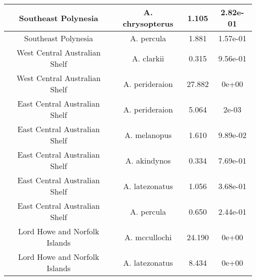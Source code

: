 \begin{table}[!h]
\begin{tabular}[t]{c|c|c|c}
\hline
Southeast Polynesia & A. chrysopterus & 1.105 & 2.82e-01\\
\hline
Southeast Polynesia & A. percula & 1.881 & 1.57e-01\\
\hline
West Central Australian Shelf & A. clarkii & 0.315 & 9.56e-01\\
\hline
West Central Australian Shelf & A. perideraion & 27.882 & 0e+00\\
\hline
East Central Australian Shelf & A. perideraion & 5.064 & 2e-03\\
\hline
East Central Australian Shelf & A. melanopus & 1.610 & 9.89e-02\\
\hline
East Central Australian Shelf & A. akindynos & 0.334 & 7.69e-01\\
\hline
East Central Australian Shelf & A. latezonatus & 1.056 & 3.68e-01\\
\hline
East Central Australian Shelf & A. percula & 0.650 & 2.44e-01\\
\hline
Lord Howe and Norfolk Islands & A. mccullochi & 24.190 & 0e+00\\
\hline
Lord Howe and Norfolk Islands & A. latezonatus & 8.434 & 0e+00\\
\hline
\end{tabular}
\end{table}